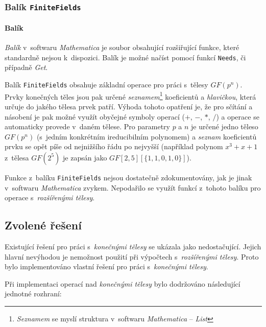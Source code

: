 \documentclass[thesis=M,czech,hidelinks]{FITthesis}[2012/06/26]
\newcommand{\0}{{\textcolor[gray]{0.100}{0}}}
\begin{document}
\subsubsection{Balík \texttt{FiniteFields}}
\paragraph{Balík} \emph{Balík} v~softwaru \emph{Mathematica} je soubor obsahující
rozšiřující funkce, které standardně nejsou k~dispozici. Balík je možné načíst
pomocí funkcí \texttt{Needs}, či případně \emph{Get}.

Balík \texttt{FiniteFields} obsahuje základní operace pro práci s~tělesy
$GF(p^n)$. Prvky konečných těles jsou pak určené \emph{seznamem}\footnote{
\emph{Seznamem} se myslí struktura v~softwaru \emph{Mathematica} -- \emph{List}
} koeficientů a \emph{hlavičkou}, která určuje do jakého tělesa prvek patří.
Výhoda tohoto opatření je, že pro sčítání a násobení je pak možné využít
obyčejné symboly operací ($+$, $-$, $*$, $/$) a operace se automaticky provede
v~daném tělese.  Pro parametry $p$ a $n$ je určené jedno těleso $GF(p^n)$
(s~jedním konkrétním ireducibilním polynomem) a \emph{seznam} koeficientů prvku
se opět píše od nejnižšího řádu po nejvyšší (například polynom $x^3 + x + 1$
z~tělesa $GF(2^5)$ je zapsán jako $GF[2,5][\{1,1,0,1,0\}] $).

Funkce z~balíku \texttt{FiniteFields} nejsou dostatečně zdokumentovány, jak
je jinak v~softwaru \emph{Mathematica} zvykem. Nepodařilo se využít funkcí
z~tohoto balíku pro operace s~\emph{rozšířenými tělesy}.

\subsection{Zvolené řešení}
Existující řešení pro práci s~\emph{konečnými tělesy} se ukázala jako
nedostačující. Jejich hlavní nevýhodou je nemožnost použití při výpočtech
s~\emph{rozšířenými tělesy}. Proto bylo implementováno vlastní řešení pro práci
s~\emph{konečnými tělesy}.

Při implementaci operací nad \emph{konečnými tělesy} bylo dodržováno následující
jednotné rozhraní:
\end{document}
